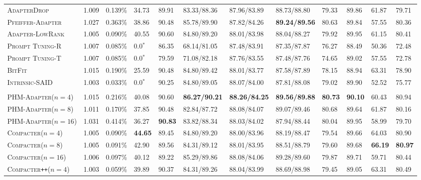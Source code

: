 \documentclass{article}
\newcommand{\adapterlowrank}{\textsc{Adapter-LowRank}\xspace}
\newcommand{\compacter}{\textsc{Compacter}\xspace}
\newcommand{\compacteronlyff}{\textsc{Compacter}\texttt{++}\xspace} %
\newcommand{\phmadapter}{\textsc{PHM-Adapter}\xspace}
\newcommand{\intrinsic}{\textsc{Intrinsic-SAID}\xspace}
\newcommand{\prompttuningrandom}{\textsc{Prompt Tuning-R}\xspace}
\newcommand{\prompttuningtokens}{\textsc{Prompt Tuning-T}\xspace}
\newcommand{\pfeifferadapter}{\textsc{Pfeiffer-Adapter}\xspace}
\newcommand{\adapterdrop}{\textsc{AdapterDrop}\xspace}
\newcommand{\bitfit}{\textsc{BitFit}\xspace}
\begin{document}
\begin{table}[H]
\begin{adjustbox}{max width=\textwidth}
\begin{tabular}{l@{\hskip 0.02in}|l@{\hskip 0.06in}l@{\hskip 0.0in}|l@{\hskip 0.08in}l@{\hskip 0.08in}l@{\hskip 0.08in}l@{\hskip 0.08in}l@{\hskip 0.08in}l@{\hskip 0.08in}l@{\hskip 0.08in}l|l}
\adapterdrop &1.009&0.139\% & 34.73 &  89.91 &  83.33/88.36 &  87.96/83.89 &  88.73/88.80 &  79.33 &  89.86 &  61.87 &  79.71 \\ 
\pfeifferadapter &1.027&0.363\% & 38.86 &  90.48 &  85.78/89.90 &  87.82/84.26 &  \textbf{89.24/89.56} &  80.63 &  89.84 &  57.55 &  80.36\\
\adapterlowrank &1.005&0.090\%&40.55 &  90.60 &  84.80/89.20 &  88.01/83.98 &  88.04/88.27 &  79.92 &  89.95 &  61.15 &  80.41 \\ 
\prompttuningrandom &1.007& 0.085\%&0.0$^*$ &  86.35 &  68.14/81.05 &  87.48/83.91 &  87.35/87.87 &  76.27 &  88.49 &  50.36 &  72.48 \\ 
\prompttuningtokens  &1.007& 0.085\%&  0.0$^*$ &  79.59 &  71.08/82.18 &  87.76/83.55 &  87.48/87.76 &  74.65 &  89.02 &  57.55 &  72.78  \\ 
\bitfit &1.015& 0.190\%& 25.59 &  90.48 &  84.80/89.42 &  88.01/83.77 &  87.58/87.89 &  78.15 &  88.94 &  63.31 &  78.90 \\
\intrinsic &1.003& 0.033\%&   0.0$^*$ &  90.25 &  84.80/89.05 &  88.07/84.00 &  87.81/88.08 &  79.02 &  89.90 &  52.52 &  75.77 \\ 
\midrule 
\rowcolor{gray!20}\multicolumn{12}{c}{\it \textbf{Our Proposed Methods}}\\
\midrule 
\phmadapter ($n=4$) &1.015 & 0.216\% &  40.08 &  90.60 &  \textbf{86.27/90.21} &  \textbf{88.26/84.25} &  \textbf{89.56/89.88} &  \textbf{80.73} &  \textbf{90.10} &  60.43 &  80.94 \\
\phmadapter ($n=8$) & 1.011& 0.170\% &  37.85 &  90.48 &  82.84/87.72 &  88.08/84.07 &  89.07/89.46 &  80.68 &  89.64 &  61.87 &  80.16 \\
\phmadapter ($n=16$) &1.031 & 0.414\% &  36.27 &  \textbf{90.83} &  83.82/88.34 &  88.03/84.02 &  87.94/88.44 &  80.04 &  89.95 &  58.99 &  79.70 \\
\midrule 
\compacter ($n=4$) & 1.005 & 0.090\% &  \textbf{44.65} &  89.45 &    84.80/89.20 &   88.00/83.96 &  88.19/88.47 &  79.54 &  89.66 &  64.03 &  80.90 \\
\compacter ($n=8$) & 1.005 & 0.091\% &  42.90 &  89.56 &  84.31/89.12 &  88.01/83.95 &  88.51/88.79 &  79.60 &  89.68 &  \textbf{66.19} &  \textbf{80.97} \\
\compacter ($n=16$) & 1.006&0.097\%  &  40.12 &  89.22 &  85.29/89.86 &  88.08/84.06 &   89.28/89.60 &  79.87 &  89.71 &  59.71 &  80.44 \\
\midrule 
\compacteronlyff ($n=4$) & 1.003 &0.059\%& 39.89 &  90.37 &  84.31/89.26 &  88.04/83.99 &  88.69/88.98 &  79.45 &  89.05 &  63.31 &  80.49 \\

\end{tabular}
\end{adjustbox}
\end{table}
\end{document}
